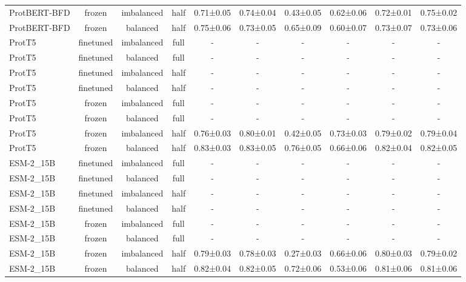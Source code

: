 \begin{tabular}{lccccccccc}
ProtBERT-BFD &         frozen & imbalanced &      half & 0.71±0.05 & 0.74±0.04 & 0.43±0.05 & 0.62±0.06 & 0.72±0.01 & 0.75±0.02 \\
ProtBERT-BFD &         frozen &   balanced &      half & 0.75±0.06 & 0.73±0.05 & 0.65±0.09 & 0.60±0.07 & 0.73±0.07 & 0.73±0.06 \\
      ProtT5 &      finetuned & imbalanced &      full &         - &         - &         - &         - &         - &         - \\
      ProtT5 &      finetuned &   balanced &      full &         - &         - &         - &         - &         - &         - \\
      ProtT5 &      finetuned & imbalanced &      half &         - &         - &         - &         - &         - &         - \\
      ProtT5 &      finetuned &   balanced &      half &         - &         - &         - &         - &         - &         - \\
      ProtT5 &         frozen & imbalanced &      full &         - &         - &         - &         - &         - &         - \\
      ProtT5 &         frozen &   balanced &      full &         - &         - &         - &         - &         - &         - \\
      ProtT5 &         frozen & imbalanced &      half & 0.76±0.03 & 0.80±0.01 & 0.42±0.05 & 0.73±0.03 & 0.79±0.02 & 0.79±0.04 \\
      ProtT5 &         frozen &   balanced &      half & 0.83±0.03 & 0.83±0.05 & 0.76±0.05 & 0.66±0.06 & 0.82±0.04 & 0.82±0.05 \\
   ESM-2\_15B &      finetuned & imbalanced &      full &         - &         - &         - &         - &         - &         - \\
   ESM-2\_15B &      finetuned &   balanced &      full &         - &         - &         - &         - &         - &         - \\
   ESM-2\_15B &      finetuned & imbalanced &      half &         - &         - &         - &         - &         - &         - \\
   ESM-2\_15B &      finetuned &   balanced &      half &         - &         - &         - &         - &         - &         - \\
   ESM-2\_15B &         frozen & imbalanced &      full &         - &         - &         - &         - &         - &         - \\
   ESM-2\_15B &         frozen &   balanced &      full &         - &         - &         - &         - &         - &         - \\
   ESM-2\_15B &         frozen & imbalanced &      half & 0.79±0.03 & 0.78±0.03 & 0.27±0.03 & 0.66±0.06 & 0.80±0.03 & 0.79±0.02 \\
   ESM-2\_15B &         frozen &   balanced &      half & 0.82±0.04 & 0.82±0.05 & 0.72±0.06 & 0.53±0.06 & 0.81±0.06 & 0.81±0.06 \\
\bottomrule
\end{tabular}

